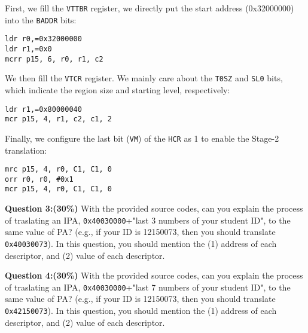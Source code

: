 First, we fill the \texttt{VTTBR} register, we directly put the start address (0x32000000) into the \texttt{BADDR} bits:

\begin{lstlisting}
ldr r0,=0x32000000
ldr r1,=0x0
mcrr p15, 6, r0, r1, c2
\end{lstlisting}


We then fill the \texttt{VTCR} register. We mainly care about the \texttt{T0SZ} and \texttt{SL0} bits, which indicate the region size and starting level, respectively:

\begin{lstlisting}
ldr r1,=0x80000040
mcr p15, 4, r1, c2, c1, 2
\end{lstlisting}

Finally, we configure the last bit (\texttt{VM}) of the \texttt{HCR} as 1 to enable the Stage-2 translation:

\begin{lstlisting}
mrc p15, 4, r0, C1, C1, 0 
orr	r0, r0, #0x1
mcr p15, 4, r0, C1, C1, 0
\end{lstlisting}

\textbf{Question 3:(30\%)} With the provided source codes, can you 
explain 
the process of traslating an IPA, \texttt{0x40030000}+"last 3 numbers 
of your student ID", to the same value of PA? (e.g., if your ID is 
12150073, then you should translate \texttt{0x40030073}).
In this question, you should mention the (1) address of each 
descriptor, and (2) value of each descriptor. 

\textbf{Question 4:(30\%)} With the provided source codes, can you 
explain 
the process of traslating an IPA, \texttt{0x40030000}+"last 7 numbers 
of your student ID", to the same value of PA? (e.g., if your ID is 
12150073, then you should translate \texttt{0x42150073}).
In this question, you should mention the (1) address of each 
descriptor, and (2) value of each descriptor.





